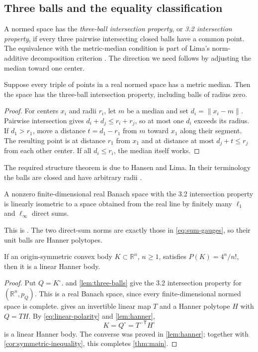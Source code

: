 \subsection{Three balls and the equality classification}

A normed space has the \emph{three-ball intersection property}, or \emph{3.2 intersection property}, if every three pairwise intersecting closed balls have a common point. The equivalence with the metric-median condition is part of Lima's norm-additive decomposition criterion \cite[Theorem~1.2]{Lima1978}. The direction we need follows by adjusting the median toward one center.

\begin{lemma}\label{lem:three-balls}
Suppose every triple of points in a real normed space has a metric median. Then the space has the three-ball intersection property, including balls of radius zero.
\end{lemma}

\begin{proof}
For centers $x_i$ and radii $r_i$, let $m$ be a median and set $d_i=\|x_i-m\|$. Pairwise intersection gives $d_i+d_j\le r_i+r_j$, so at most one $d_i$ exceeds its radius. If $d_1>r_1$, move a distance $t=d_1-r_1$ from $m$ toward $x_1$ along their segment. The resulting point is at distance $r_1$ from $x_1$ and at distance at most $d_j+t\le r_j$ from each other center. If all $d_i\le r_i$, the median itself works.
\end{proof}

The required structure theorem is due to Hansen and Lima. In their terminology the balls are closed and have arbitrary radii \cite[Section~1]{HansenLima1981}.

\begin{theorem}\label{thm:hansen-lima}
A nonzero finite-dimensional real Banach space with the 3.2 intersection property is linearly isometric to a space obtained from the real line by finitely many $\ell_1$ and $\ell_\infty$ direct sums.
\end{theorem}

This is \cite[Corollary~7.4]{HansenLima1981}. The two direct-sum norms are exactly those in \eqref{eq:sum-gauges}, so their unit balls are Hanner polytopes.

\begin{proposition}\label{prop:equality-classification}
If an origin-symmetric convex body $K\subset\mathbb{R}^n$, $n\ge1$, satisfies $P(K)=4^n/n!$, then it is a linear Hanner body.
\end{proposition}

\begin{proof}
Put $Q=K^\circ$.  and \cref{lem:three-balls} give the 3.2 intersection property for $(\mathbb{R}^n,p_Q)$. This is a real Banach space, since every finite-dimensional normed space is complete.  gives an invertible linear map $T$ and a Hanner polytope $H$ with $Q=TH$. By \eqref{eq:linear-polarity} and \cref{lem:hanner},
\[
 K=Q^\circ=T^{-\mathsf T}H^\circ
\]
is a linear Hanner body. The converse was proved in \cref{lem:hanner}; together with \cref{cor:symmetric-inequality}, this completes \cref{thm:main}.
\end{proof}
